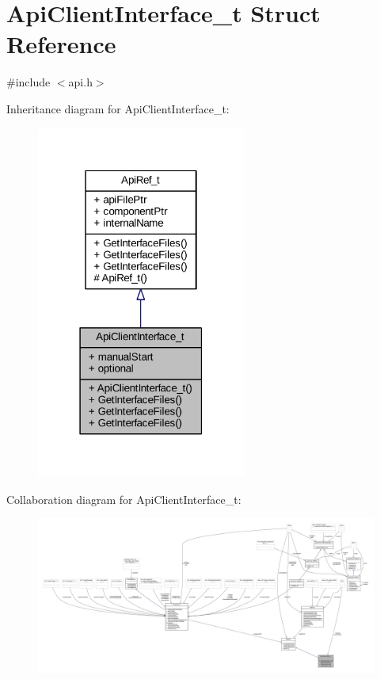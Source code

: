\hypertarget{struct_api_client_interface__t}{}\section{Api\+Client\+Interface\+\_\+t Struct Reference}
\label{struct_api_client_interface__t}


{\ttfamily \#include $<$api.\+h$>$}



Inheritance diagram for Api\+Client\+Interface\+\_\+t\+:
\nopagebreak
\begin{figure}[H]
\begin{center}
\leavevmode
\includegraphics[width=195pt]{struct_api_client_interface__t__inherit__graph}
\end{center}
\end{figure}


Collaboration diagram for Api\+Client\+Interface\+\_\+t\+:
\nopagebreak
\begin{figure}[H]
\begin{center}
\leavevmode
\includegraphics[width=350pt]{struct_api_client_interface__t__coll__graph}
\end{center}
\end{figure}
